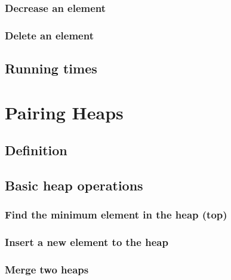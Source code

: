 \documentclass{article}
\begin{document}
\subsubsection{Decrease an element}

\subsubsection{Delete an element}

\subsection{Running times}



\section{Pairing Heaps}
\label{pairing-heap}

\subsection{Definition}

\subsection{Basic heap operations}

\subsubsection{Find the minimum element in the heap (top)}

\subsubsection{Insert a new element to the heap}

\subsubsection{Merge two heaps}
\end{document}
